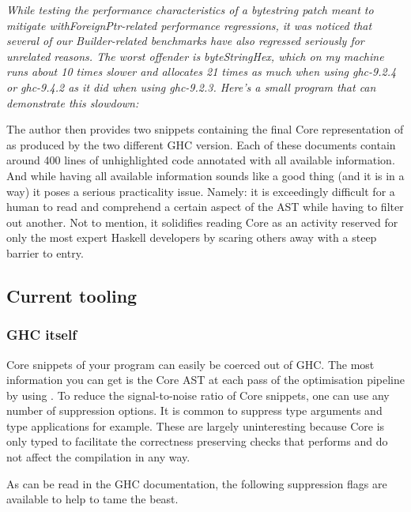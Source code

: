 \textit{While testing the performance characteristics of a bytestring patch meant to mitigate withForeignPtr-related performance regressions,
it was noticed that several of our Builder-related benchmarks have also regressed seriously for unrelated reasons.
The worst offender is byteStringHex, which on my machine runs about 10 times slower and allocates 21 times as much when using ghc-9.2.4 or ghc-9.4.2
as it did when using ghc-9.2.3. Here's a small program that can demonstrate this slowdown:}
\hfill \break

The author then provides two snippets containing the final Core representation of  as produced by the two different GHC version.
Each of these documents contain around 400 lines of unhighlighted code annotated with all available information. And while having all available information
sounds like a good thing (and it is in a way) it poses a serious practicality issue.
Namely: it is exceedingly difficult for a human to read and comprehend a certain aspect of the AST while having to filter out another.
Not to mention, it solidifies reading Core as an activity reserved for only the most expert Haskell developers by scaring others away with
a steep barrier to entry.

\subsection{Current tooling}

\subsubsection{GHC itself}
\label{section:background:ghc}


Core snippets of your program can easily be coerced out of GHC. The most information you can get
is the Core AST at each pass of the optimisation pipeline by using .
To reduce the signal-to-noise ratio of Core snippets, one can use any number of suppression options.
It is common to suppress type arguments and type applications for example. These are largely
uninteresting because Core is only typed to facilitate the correctness preserving checks that  performs
and do not affect the compilation in any way.

As can be read in the GHC documentation, the following suppression flags are available to help to tame the beast.

